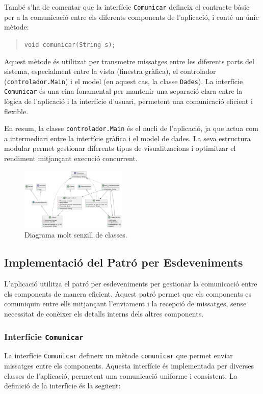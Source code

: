 \documentclass{ieeetj}
\begin{document}
\begin{itemize}
\begin{itemize}
\end{itemize}
També s'ha de comentar que la interfície \texttt{Comunicar} defineix el contracte bàsic per a la comunicació entre els diferents components de l'aplicació, i conté un únic mètode:

\begin{quote}
\texttt{void comunicar(String s);}
\end{quote}

Aquest mètode és utilitzat per transmetre missatges entre les diferents parts del sistema, especialment entre la vista (finestra gràfica), el controlador (\texttt{controlador.Main}) i el model (en aquest cas, la classe \texttt{Dades}). La interfície \texttt{Comunicar} és una eina fonamental per mantenir una separació clara entre la lògica de l'aplicació i la interfície d'usuari, permetent una comunicació eficient i flexible.

En resum, la classe \texttt{controlador.Main} és el nucli de l'aplicació, ja que actua com a intermediari entre la interfície gràfica i el model de dades. La seva estructura modular permet gestionar diferents tipus de visualitzacions i optimitzar el rendiment mitjançant execució concurrent.
\end{itemize}
\begin{figure}[htbp]
\centerline{\includegraphics[width=0.45\textwidth]{docs/png/diagrma_clases.png}}
\caption{Diagrama molt senzill de classes.}
\label{fig:digC}
\end{figure}


\subsection{Implementació del Patró per Esdeveniments}
L'aplicació utilitza el patró per esdeveniments per gestionar la comunicació entre els components de manera eficient. Aquest patró permet que els components es comuniquin entre ells mitjançant l'enviament i la recepció de missatges, sense necessitat de conèixer els detalls interns dels altres components.

\subsubsection{Interfície \texttt{Comunicar}}
La interfície \texttt{Comunicar} defineix un mètode \texttt{comunicar} que permet enviar missatges entre els components. Aquesta interfície és implementada per diverses classes de l'aplicació, permetent una comunicació uniforme i consistent. La definició de la interfície és la següent:
\end{document}
